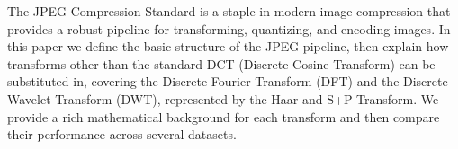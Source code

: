 The JPEG Compression Standard is a staple in modern image compression that provides a robust pipeline for transforming, quantizing, and encoding images. In this paper we define the basic structure of the JPEG pipeline, then explain how transforms other than the standard DCT (Discrete Cosine Transform) can be substituted in, covering the Discrete Fourier Transform (DFT) and the Discrete Wavelet Transform (DWT), represented by the Haar and S+P Transform. We provide a rich mathematical background for each transform and then compare their performance across several datasets.